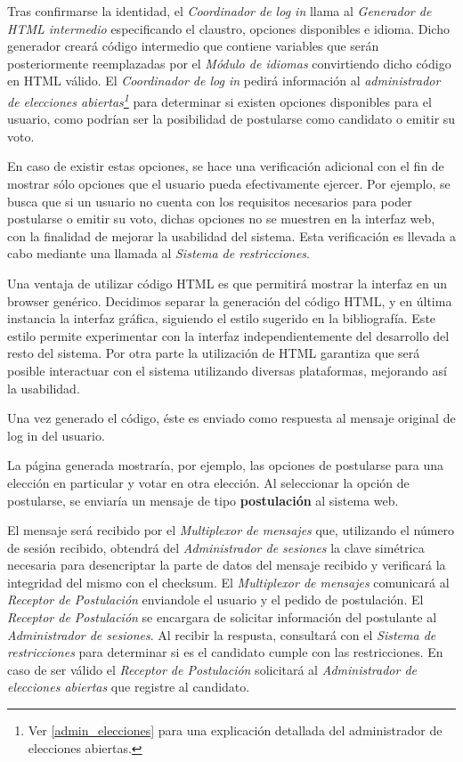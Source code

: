 Tras confirmarse la identidad, el \emph{Coordinador de log in} llama al \emph{Generador de HTML intermedio} especificando el claustro, opciones disponibles e idioma. Dicho generador creará código intermedio que contiene variables que serán posteriormente reemplazadas por el \emph{Módulo de idiomas} convirtiendo dicho código en HTML válido. 
El \emph{Coordinador de log in} pedirá información al \emph{administrador de elecciones abiertas\footnote{Ver \ref{admin_elecciones} para una explicación detallada del administrador de elecciones abiertas.}} para determinar si existen opciones disponibles para el usuario, como podrían ser la posibilidad de postularse como candidato o emitir su voto.




En caso de existir estas opciones, se hace una verificación adicional con el fin de mostrar sólo opciones que el usuario pueda efectivamente ejercer.  
Por ejemplo, se busca que si un usuario no cuenta con los requisitos necesarios para poder postularse o emitir su voto, dichas opciones no se muestren en la interfaz web, con la finalidad de mejorar la usabilidad del sistema. 
Esta verificación es llevada a cabo mediante una llamada al \emph{Sistema de restricciones}.


Una ventaja de utilizar código HTML es que permitirá mostrar la interfaz en un browser genérico. 
Decidimos separar la generación del código HTML, y en última instancia la interfaz gráfica, siguiendo el estilo sugerido en la bibliografía. 
Este estilo permite experimentar con la interfaz independientemente del desarrollo del resto del sistema. 
Por otra parte la utilización de HTML garantiza que será posible interactuar con el sistema utilizando diversas plataformas, mejorando así la usabilidad.


Una vez generado el código, éste es enviado como respuesta al mensaje original de log in del usuario. 

La página generada mostraría, por ejemplo, las opciones de postularse para una elección en particular y votar en otra elección. Al seleccionar la opción de postularse, se enviaría un mensaje de tipo {\bf postulación} al sistema web. 

El mensaje será recibido por el \emph{Multiplexor de mensajes} que, utilizando el número de sesión recibido, obtendrá del \emph{Administrador de sesiones} la clave simétrica necesaria para desencriptar la parte de datos del mensaje recibido y verificará la integridad del mismo con el checksum.
El \emph{Multiplexor de mensajes} comunicará al \emph{Receptor de Postulación} enviandole el usuario y el pedido de postulación. El \emph{Receptor de Postulación} se encargara de solicitar información del postulante al \emph{Administrador de sesiones}. Al recibir la respusta, consultar\'a con el \emph{Sistema de restricciones} para determinar si es el candidato cumple con las restricciones. En caso de ser v\'alido el \emph{Receptor de Postulación} solicitará al \emph{Administrador de elecciones abiertas} que registre al candidato.

